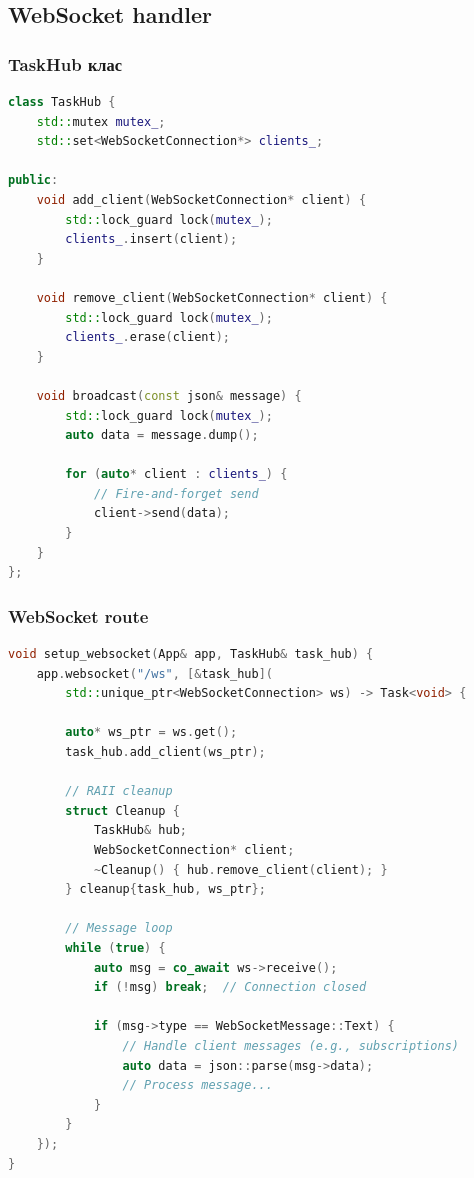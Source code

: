 \subsection{WebSocket handler}

\subsubsection{TaskHub клас}

\begin{lstlisting}[language=C++, basicstyle=\small\ttfamily, caption={WebSocket TaskHub}]
class TaskHub {
    std::mutex mutex_;
    std::set<WebSocketConnection*> clients_;
    
public:
    void add_client(WebSocketConnection* client) {
        std::lock_guard lock(mutex_);
        clients_.insert(client);
    }
    
    void remove_client(WebSocketConnection* client) {
        std::lock_guard lock(mutex_);
        clients_.erase(client);
    }
    
    void broadcast(const json& message) {
        std::lock_guard lock(mutex_);
        auto data = message.dump();
        
        for (auto* client : clients_) {
            // Fire-and-forget send
            client->send(data);
        }
    }
};
\end{lstlisting}

\subsubsection{WebSocket route}

\begin{lstlisting}[language=C++, basicstyle=\small\ttfamily, caption={WebSocket route setup}]
void setup_websocket(App& app, TaskHub& task_hub) {
    app.websocket("/ws", [&task_hub](
        std::unique_ptr<WebSocketConnection> ws) -> Task<void> {
        
        auto* ws_ptr = ws.get();
        task_hub.add_client(ws_ptr);
        
        // RAII cleanup
        struct Cleanup {
            TaskHub& hub;
            WebSocketConnection* client;
            ~Cleanup() { hub.remove_client(client); }
        } cleanup{task_hub, ws_ptr};
        
        // Message loop
        while (true) {
            auto msg = co_await ws->receive();
            if (!msg) break;  // Connection closed
            
            if (msg->type == WebSocketMessage::Text) {
                // Handle client messages (e.g., subscriptions)
                auto data = json::parse(msg->data);
                // Process message...
            }
        }
    });
}
\end{lstlisting}

